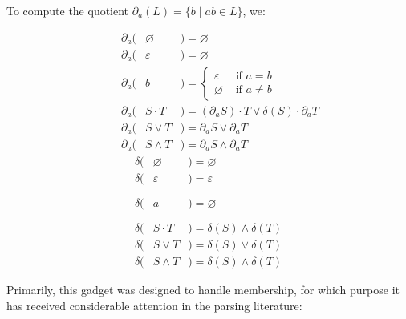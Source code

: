 \documentclass[sigplan,review,acmsmall,nonacm,screen,anonymous]{acmart}\settopmatter{printfolios=false,printccs=false,printacmref=false}
\begin{document}
  \begin{definition}[Brzozowski, 1964]
    To compute the quotient \(\partial_a(L) = \{b \mid ab \in L\}\), we:

    \vspace{-0.8cm}
    \begin{multicols}{2}
      \begin{eqnarray*}
        \phantom{--}\partial_a(& \varnothing &) = \varnothing                                           \\
        \phantom{--}\partial_a(& \varepsilon &) = \varnothing                                           \\
        \phantom{--}\partial_a(& b           &) = \begin{cases}\varepsilon &\text{ if } a = b\\ \varnothing &\text{ if } a \neq b \end{cases}\\
        \phantom{--}\partial_a(& S\cdot T    &) = (\partial_a S)\cdot T \vee \delta(S)\cdot\partial_a T \\
        \phantom{--}\partial_a(& S\vee  T    &) = \partial_a S \vee  \partial_a T                        \\
        \phantom{--}\partial_a(& S\land T    &) = \partial_a S \land \partial_a T
      \end{eqnarray*} \break\vspace{-0.45cm}
      \begin{eqnarray*}
        \delta(& \varnothing &)= \varnothing                                      \\
        \delta(& \varepsilon &)= \varepsilon                                      \\
        \delta(& a           &)= \varnothing\phantom{\begin{cases}\varepsilon\\\varnothing\end{cases}}\\
        \delta(& S\cdot T    &)= \delta(S) \land \delta(T)                        \\
        \delta(& S\vee T     &)= \delta(S) \vee  \delta(T)                        \\
        \delta(& S\land T    &)= \delta(S) \land \delta(T)
      \end{eqnarray*}
    \end{multicols}
  \end{definition}

  Primarily, this gadget was designed to handle membership, for which purpose it has received considerable attention in the parsing literature:
\end{document}
